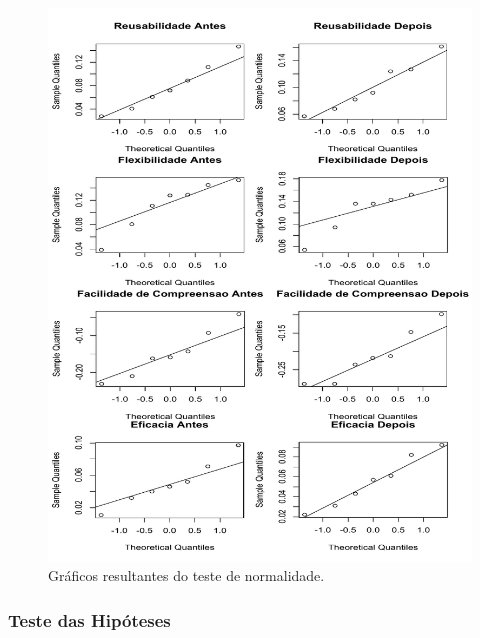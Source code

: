 \begin{figure}[h]
	\centering
	\caption{Gráficos resultantes do teste de normalidade.}
	\label{fig:qq_plot_experimento1}
	\includegraphics[scale=0.9]{images/qqPlotAll2_experimento1}
	\fautor
\end{figure}

\subsubsection{Teste das Hipóteses}

